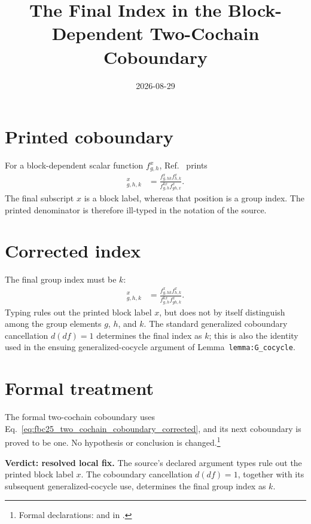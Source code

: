 \documentclass{article}
\title{The Final Index in the Block-Dependent Two-Cochain Coboundary}
\author{}
\date{2026-08-29}
\begin{document}
\maketitle
{}

\section{Printed coboundary}

For a block-dependent scalar function $f^x_{g,h}$,
Ref.~\cite[lines~5918--5921]{FrancoRubio2025MPUGauging} prints
\begin{align}
    [df]^x_{g,h,k}
        &=\frac{f^x_{g,hk}f^x_{h,k}}
        {f^{kx}_{g,h}f^x_{gh,x}}.
    \label{eq:fbc25_two_cochain_coboundary_printed}
\end{align}
The final subscript $x$ is a block label, whereas that position is a group
index. The printed denominator is therefore ill-typed in the notation of the
source.

\section{Corrected index}

The final group index must be $k$:
\begin{align}
    [df]^x_{g,h,k}
        &=\frac{f^x_{g,hk}f^x_{h,k}}
        {f^{kx}_{g,h}f^x_{gh,k}}.
    \label{eq:fbc25_two_cochain_coboundary_corrected}
\end{align}
Typing rules out the printed block label $x$, but does not by itself
distinguish among the group elements $g$, $h$, and $k$.  The standard
generalized coboundary cancellation $d(df)=1$ determines the final index as
$k$; this is also the identity used in the ensuing generalized-cocycle
argument of Lemma~\texttt{lemma:G\_cocycle}.

\section{Formal treatment}

The formal two-cochain coboundary uses
Eq.~\ref{eq:fbc25_two_cochain_coboundary_corrected}, and its next coboundary
is proved to be one. No hypothesis or conclusion is changed.\footnote{Formal
declarations:  and
 in
.}

\textbf{Verdict: resolved local fix.}
The source's declared argument types rule out the printed block label $x$.
The coboundary cancellation $d(df)=1$, together with its subsequent
generalized-cocycle use, determines the final group index as $k$.



\end{document}
